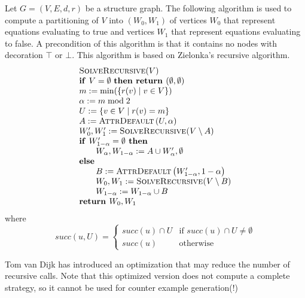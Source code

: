 \documentclass{article}
\newcommand{\If}{\text{\textbf{if }}}
\newcommand{\Then}{\text{\textbf{ then }}}
\newcommand{\Else}{\text{\textbf{else }}}
\newcommand{\Return}{\text{\textbf{return }}}
\begin{document}
Let $G=(V,E,d,r)$ be a structure graph. The following algorithm is used to compute
a partitioning of $V$ into $\left( W_{0},W_{1}\right) $ of vertices $W_{0}$ that
represent equations evaluating to true and vertices $W_{1}$ that represent equations
evaluating to false. A precondition of this algorithm is that it contains no nodes with
decoration $\top $ or $\bot$. This algorithm is based on Zielonka's recursive algorithm.
\begin{equation*}
\begin{array}{l}
\textsc{SolveRecursive}(V) \\ 
\If V=\emptyset \text{ \textbf{then return }}(\emptyset
,\emptyset ) \\ 
m:=\min (\{r(v)\mid v\in V\}) \\ 
\alpha := m \bmod 2 \\ 
U:=\{v\in V\mid r(v)=m\} \\ 
A:=\text{\textsc{AttrDefault}}\left( U,\alpha \right)  \\ 
W_{0}^{\prime },W_{1}^{\prime }:=\text{\textsc{SolveRecursive(}}V\setminus A%
\text{)} \\ 
\If W_{1-\alpha }^{\prime }= \emptyset \Then \\ 
\qquad W_{\alpha },W_{1-\alpha }:=A\cup W_{\alpha }^{\prime }, \emptyset \\ 
\Else \\ 
\qquad B:=\text{\textsc{AttrDefault}}\left( W_{1-\alpha }^{\prime },1-\alpha \right)  \\ 
\qquad W_{0},W_{1}:=\text{\textsc{SolveRecursive(}}V\setminus B\text{)} \\ 
\qquad W_{1-\alpha }:=W_{1-\alpha }\cup B \\ 
\Return W_{0},W_{1}%
\end{array}%
\end{equation*}%
where%
\begin{equation*}
succ(u,U)=\left\{ 
\begin{array}{ll}
succ(u)\cap U & \text{if }succ(u)\cap U\neq \emptyset  \\ 
succ(u) & \text{otherwise}%
\end{array}%
\right. 
\end{equation*}

Tom van Dijk has introduced an optimization that may reduce the number of recursive calls. Note that this optimized version does not compute a complete strategy, so it
cannot be used for counter example generation(!)
\end{document}
